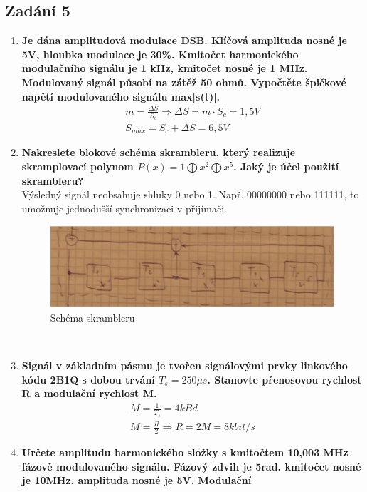 \subsection{Zadání 5}
\begin{enumerate}
    \item \textbf{Je dána amplitudová modulace DSB. Klíčová amplituda nosné je 5V, hloubka modulace je
    30\%. Kmitočet harmonického modulačního signálu je 1 kHz, kmitočet nosné je 1 MHz.
    Modulovaný signál působí na zátěž 50 ohmů. Vypočtěte špičkové napětí modulovaného
    signálu max[s(t)].}
    \begin{gather*}
        m = \frac{\Delta S}{S_c} \Rightarrow \Delta S = m\cdot S_c = 1,5V\\
        S_{max} = S_c + \Delta S = 6,5V
    \end{gather*}
    \item \textbf{Nakreslete blokové schéma skrambleru, který realizuje skramplovací polynom \(P(x) = 1
    \bigoplus  x^2 \bigoplus  x^5\). Jaký je účel použití skrambleru?}\\
    Výsledný signál neobsahuje shluky 0 nebo 1. Např. 00000000 nebo 111111, to umožnuje
    jednodušší synchronizaci v přijímači.\\
    \begin{figure}[h]
        \centering
        \includegraphics[scale = 0.3]{images/Skrambler.png}
        \caption{Schéma skrambleru}
    \end{figure}\\
    \item \textbf{Signál v základním pásmu je tvořen signálovými prvky linkového kódu 2B1Q s dobou
    trvání \(T_s = 250\mu s\). Stanovte přenosovou rychlost R a modulační rychlost M.}
    \begin{gather*}
        M = \frac{1}{T_s} = 4kBd\\
        M = \frac{R}{2} \Rightarrow R = 2M = 8kbit/s
    \end{gather*}
    \item \textbf{Určete amplitudu harmonického složky s kmitočtem 10,003 MHz fázově modulovaného
    signálu. Fázový zdvih je 5rad. kmitočet nosné je 10MHz. amplituda nosné je 5V. Modulační
}
\end{enumerate}
